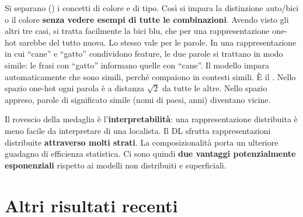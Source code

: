 \begin{idea}
Si separano () i concetti di colore e di tipo. Così si impara la distinzione auto/bici o il
colore \textbf{senza vedere esempi di tutte le combinazioni}. Avendo visto gli altri tre casi, si tratta facilmente
la bici blu, che per una rappresentazione one-hot sarebbe del tutto nuova. Lo stesso vale per le parole. In una
rappresentazione in cui ``cane'' e ``gatto'' condividono feature, le due parole si trattano in modo simile: le frasi
con ``gatto'' informano quelle con ``cane''. Il modello impara automaticamente che sono simili, perché compaiono in
contesti simili. È il . Nello spazio one-hot ogni parola è a distanza $\sqrt2$ da tutte le
altre. Nello spazio appreso, parole di significato simile (nomi di paesi, anni) diventano vicine.
\end{idea}

Il rovescio della medaglia è l'\textbf{interpretabilità}: una rappresentazione distribuita è meno facile da
interpretare di una localista. Il DL sfrutta rappresentazioni distribuite \textbf{attraverso molti strati}. La
composizionalità porta un ulteriore guadagno di efficienza statistica. Ci sono quindi \textbf{due vantaggi
potenzialmente esponenziali} rispetto ai modelli non distribuiti e superficiali.

\section{Altri risultati recenti}
\label{sec:double-descent}

